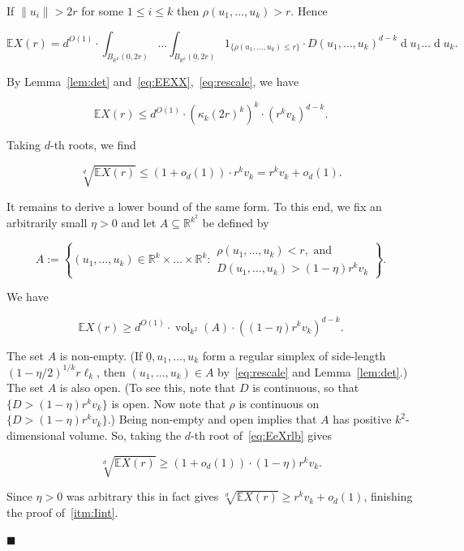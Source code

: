 \documentclass[11pt]{article}%
\newenvironment{proofof}[1]{\vspace{1ex}\noindent{\bf Proof of #1.}}{\hspace*{\fill}$\blacksquare$\vspace{1ex}}
\newcommand{\eR}[0]{\ensuremath{ \mathbb R}}
\newcommand{\norm}[1]{\ensuremath{\|#1\|}}
\newcommand{\Ee}[0]{\ensuremath{{\mathbb E}}}
\newcommand{\orig}{\underline{0}}
\DeclareMathOperator{\vol}{vol}
\DeclareMathOperator{\dd}{d}
\begin{document}
\begin{proofof}{Lemma~\ref{lem:Iint}}
If $\norm{u_i} > 2r$ for some $1\leq i \leq k$ then $\rho(u_1,\dots,u_k)>r$.
Hence 

\begin{equation}\label{eq:EEXX} 
\Ee X(r) = d^{O(1)} \cdot \int_{B_{\eR^k}(\orig,2r)}\dots\int_{B_{\eR^k}(\orig,2r)} 
1_{\{\rho(u_1,\dots,u_k) \leq r\}}\cdot D(u_1,\dots,u_k)^{d-k} \dd u_1\dots\dd u_k. 
\end{equation}

\noindent
By Lemma~\ref{lem:det} and~\eqref{eq:EEXX},~\eqref{eq:rescale}, we have

$$ \Ee X(r) \leq d^{O(1)} \cdot \left( \kappa_k (2r)^k \right)^k \cdot \left( r^k v_k \right)^{d-k}. $$

\noindent 
Taking $d$-th roots, we find 

$$ \sqrt[d]{\Ee X(r)} \leq (1+o_d(1)) \cdot r^k v_k = r^k v_k + o_d(1). $$

It remains to derive a lower bound of the same form. To this end, we fix an arbitrarily small $\eta>0$ and 
let $A \subseteq \eR^{k^2}$ be defined by

$$ A := \left\{ (u_1,\dots,u_k) \in \eR^k \times\dots\times\eR^k :
\begin{array}{l} \rho(u_1,\dots,u_k) < r,\text{ and}\\
D(u_1,\dots,u_k)>(1-\eta) r^k v_k 
\end{array}\right\}. $$

\noindent
We have

\begin{equation}\label{eq:EeXrlb} 
\Ee X(r) \geq d^{O(1)} \cdot \vol_{k^2}(A) \cdot \left((1-\eta)r^k v_k\right)^{d-k}. 
 \end{equation}


The set $A$ is non-empty. (If $\orig,u_1,\dots,u_k$ form a regular simplex of
side-length $(1-\eta/2)^{1/k} r \ell_k$, then $(u_1,\dots,u_k) \in A$ by~\eqref{eq:rescale}
and Lemma~\ref{lem:det}.) 
The set $A$ is also open. (To see this, note that $D$ is continuous, so that $\{D>(1-\eta)r^kv_k\}$
is open. Now note that $\rho$ is continuous on $\{D>(1-\eta)r^kv_k\}$.)
Being non-empty and open implies that $A$ has positive $k^2$-dimensional volume.
So, taking the $d$-th root of~\eqref{eq:EeXrlb} gives 

$$ \sqrt[d]{\Ee X(r)} \geq (1+o_d(1)) \cdot (1-\eta) r^k v_k. $$

\noindent
Since $\eta>0$ was arbitrary this in fact gives $\sqrt[d]{\Ee X(r)} \geq r^k v_k +o_d(1)$, finishing the
proof of~\ref{itm:Iint}.


\end{proofof}
\end{document}

